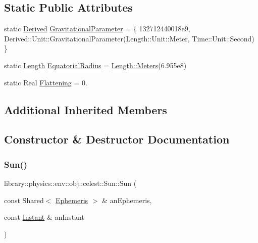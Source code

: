 \subsection*{Static Public Attributes}
\begin{DoxyCompactItemize}
\item 
static \hyperlink{classlibrary_1_1physics_1_1units_1_1_derived}{Derived} \hyperlink{classlibrary_1_1physics_1_1env_1_1obj_1_1celest_1_1_sun_abdaf89ab0651e1cd00701de41f728427}{Gravitational\+Parameter} = \{ 132712440018e9, Derived\+::\+Unit\+::\+Gravitational\+Parameter(\+Length\+::\+Unit\+::\+Meter, Time\+::\+Unit\+::\+Second) \}
\item 
static \hyperlink{classlibrary_1_1physics_1_1units_1_1_length}{Length} \hyperlink{classlibrary_1_1physics_1_1env_1_1obj_1_1celest_1_1_sun_a48679ac65c067b77adf005ce9ca5cfca}{Equatorial\+Radius} = \hyperlink{classlibrary_1_1physics_1_1units_1_1_length_ad523a3737d5c3f23a64588eac83f2148}{Length\+::\+Meters}(6.\+955e8)
\item 
static Real \hyperlink{classlibrary_1_1physics_1_1env_1_1obj_1_1celest_1_1_sun_a48caf436831d176c692b6aa714b77676}{Flattening} = 0.
\end{DoxyCompactItemize}
\subsection*{Additional Inherited Members}


\subsection{Constructor \& Destructor Documentation}
\mbox{\label{classlibrary_1_1physics_1_1env_1_1obj_1_1celest_1_1_sun_a20417f820f88fc392046cde89cce8815}} 
\subsubsection{\texorpdfstring{Sun()}{Sun()}}
{\footnotesize\ttfamily library\+::physics\+::env\+::obj\+::celest\+::\+Sun\+::\+Sun (\begin{DoxyParamCaption}\item[{const Shared$<$ \hyperlink{classlibrary_1_1physics_1_1env_1_1_ephemeris}{Ephemeris} $>$ \&}]{an\+Ephemeris,  }\item[{const \hyperlink{classlibrary_1_1physics_1_1time_1_1_instant}{Instant} \&}]{an\+Instant }\end{DoxyParamCaption})}

